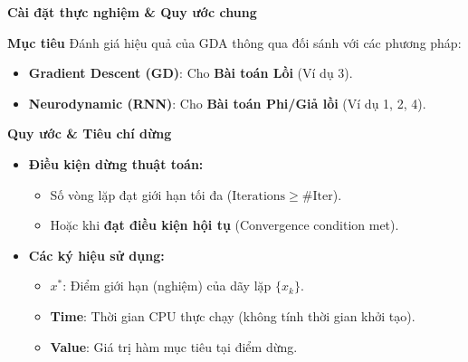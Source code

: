 \begin{frame}{\textbf{\large  Cài đặt thực nghiệm \& Quy ước chung} }
    \vspace*{-1cm} 
    
    \begin{block}{\textbf{Mục tiêu}}
        \small
        Đánh giá hiệu quả của GDA thông qua đối sánh với các phương pháp:
        \begin{itemize}
            \item \textbf{Gradient Descent (GD)}: Cho \textbf{Bài toán Lồi} (Ví dụ 3).
            \item \textbf{Neurodynamic (RNN)}: Cho \textbf{Bài toán Phi/Giả lồi} (Ví dụ 1, 2, 4).
        \end{itemize}
    \end{block}

    \vspace{-0.2cm}
    \begin{block}{\textbf{Quy ước \& Tiêu chí dừng}} 
        \begin{itemize}
            \item \textbf{Điều kiện dừng thuật toán:}
            \begin{itemize}
                \item Số vòng lặp đạt giới hạn tối đa ($\text{Iterations} \ge \#\text{Iter}$).
                \item Hoặc khi \textbf{đạt điều kiện hội tụ} (Convergence condition met).
            \end{itemize}
            
            \vspace{0.1cm}
            \item \textbf{Các ký hiệu sử dụng:}
            \begin{itemize}
                \item $x^*$: Điểm giới hạn (nghiệm) của dãy lặp $\{x_k\}$.
                \item \textbf{Time}: Thời gian CPU thực chạy (không tính thời gian khởi tạo).
                \item \textbf{Value}: Giá trị hàm mục tiêu tại điểm dừng.
            \end{itemize}
        \end{itemize}
    \end{block}
\end{frame}

